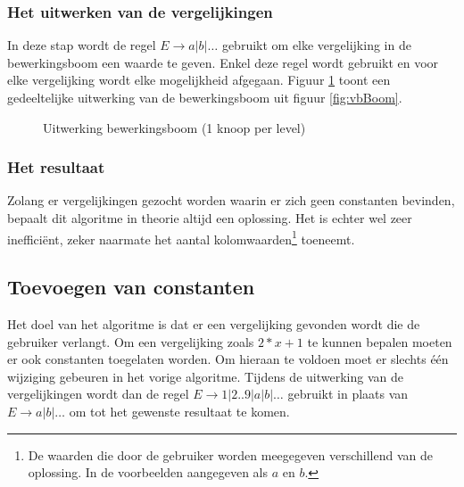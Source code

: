 \documentclass[Main.tex]{subfiles}
\begin{document}
\subsubsection*{Het uitwerken van de vergelijkingen}
In deze stap wordt de regel $E \rightarrow a | b | \dotsc$ gebruikt om elke vergelijking in de bewerkingsboom een waarde te geven. Enkel deze regel wordt gebruikt en voor elke vergelijking wordt elke mogelijkheid afgegaan. Figuur \ref{fig:uitwerkingsboom} toont een gedeeltelijke uitwerking van de bewerkingsboom uit figuur \ref{fig:vbBoom}.
\begin{figure}[!htb]
\centering
{}
\caption{Uitwerking bewerkingsboom (1 knoop per level)} \label{fig:uitwerkingsboom}
\end{figure}

\subsubsection*{Het resultaat}
Zolang er vergelijkingen gezocht worden waarin er zich geen constanten bevinden, bepaalt dit algoritme in theorie altijd een oplossing. Het is echter wel zeer ineffici\"ent, zeker naarmate het aantal kolomwaarden\footnote{\label{note:kolomwaarden} De waarden die door de gebruiker worden meegegeven verschillend van de oplossing. In de voorbeelden aangegeven als $a$ en $b$.} toeneemt.

\subsection{Toevoegen van constanten}
Het doel van het algoritme is dat er een vergelijking gevonden wordt die de gebruiker verlangt. Om een vergelijking zoals $2 \ast x+1$ te kunnen bepalen moeten er ook constanten toegelaten worden. Om hieraan te voldoen moet er slechts \'e\'en wijziging gebeuren in het vorige algoritme. Tijdens de uitwerking van de vergelijkingen wordt dan de regel $E \rightarrow 1 | 2 .. 9 | a | b | \dotsc$ gebruikt in plaats van $E \rightarrow a | b | \dotsc$ om tot het gewenste resultaat te komen.
\end{document}
